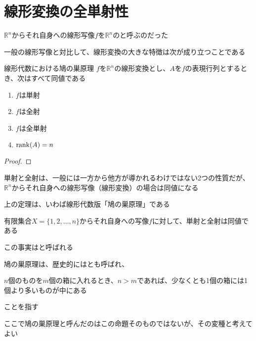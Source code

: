 \documentclass[../../../topic_linear-algebra]{subfiles}
\begin{document}
\sectionline
\section{線形変換の全単射性}

$\mathbb{R}^n$からそれ自身への線形写像$f$を$\mathbb{R}^n$のと呼ぶのだった

一般の線形写像と対比して、線形変換の大きな特徴は次が成り立つことである

\begin{theorem}{線形代数における鳩の巣原理}
  $f$を$\mathbb{R}^n$の線形変換とし、$A$を$f$の表現行列とするとき、次はすべて同値である
  \begin{enumerate}[label=\romanlabel]
    \item $f$は単射
    \item $f$は全射
    \item $f$は全単射
    \item $\rank(A) = n$
  \end{enumerate}
\end{theorem}

\begin{proof}
\end{proof}

単射と全射は、一般には一方から他方が導かれるわけではない2つの性質だが、$\mathbb{R}^n$からそれ自身への線形写像（線形変換）の場合は同値になる

\br

上の定理は、いわば線形代数版「鳩の巣原理」である

\begin{shaded}
  有限集合$X = \{ 1, 2, \dots, n \}$からそれ自身への写像$f$に対して、単射と全射は同値である
\end{shaded}
この事実はと呼ばれる

\br

鳩の巣原理は、歴史的にはとも呼ばれ、
\begin{shaded}
  $n$個のものを$m$個の箱に入れるとき、$n > m$であれば、少なくとも1個の箱には1個より多いものが中にある
\end{shaded}
ことを指す

\br

ここで鳩の巣原理と呼んだのはこの命題そのものではないが、その変種と考えてよい
\end{document}
